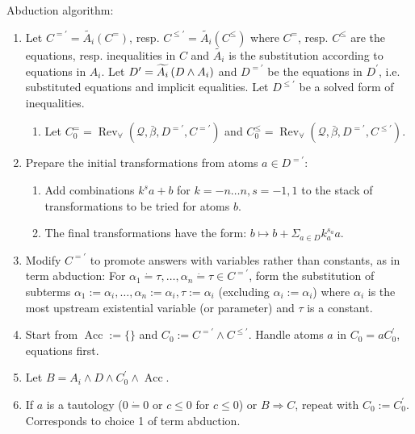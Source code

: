 \documentclass{article}
\newcommand{\assign}{:=}
\newcommand{\tmop}[1]{\ensuremath{\operatorname{#1}}}
\begin{document}
Abduction algorithm:
\begin{enumerate}
  \item Let $C^{=\prime} = \widetilde{A_i} (C^=)$, resp. $C^{\leqslant \prime}
  = \widetilde{A_i} (C^{\leqslant})$ where $C^=$, resp. $C^{\leqslant}$ are
  the equations, resp. inequalities in $C$ and $\widetilde{A_i}$ is the
  substitution according to equations in $A_i$. Let $D^{\prime} =
  \widetilde{A_i} \left( D \wedge {\nobreak} A_i \right)$ and $D^{=\prime}$ be
  the equations in $D^{\prime}$, i.e. substituted equations and implicit
  equalities. Let $D^{\leqslant \prime}$ be a solved form of inequalities.
  \begin{enumerate}
    \item Let $C^=_0 = \tmop{Rev}_{\forall} (\mathcal{Q}, \bar{\beta},
    D^{=\prime}, C^{=\prime})$ and $C^{\leqslant}_0 = \tmop{Rev}_{\forall}
    (\mathcal{Q}, \bar{\beta}, D^{=\prime}, C^{\leqslant \prime})$.
  \end{enumerate}
  \item Prepare the initial transformations from atoms $a \in D^{=\prime}$:
  \begin{enumerate}
    \item Add combinations $k^s a + b$ for $k = - n \ldots n, s = - 1, 1$ to
    the stack of transformations to be tried for atoms $b$.
    
    \item The final transformations have the form: $b \mapsto b + \Sigma_{a
    \in D} k_a^{s_a} a$.
  \end{enumerate}
  \item Modify $C^{=\prime}$ to promote answers with variables rather than
  constants, as in term abduction: For $\alpha_1 \dot{=} \tau, \ldots,
  \alpha_n \dot{=} \tau \in C^{=\prime}$, form the substitution of subterms
  $\alpha_1 \assign \alpha_i, \ldots, \alpha_n \assign \alpha_i, \tau \assign
  \alpha_i$ (excluding $\alpha_i \assign \alpha_i$) where $\alpha_i$ is the
  most upstream existential variable (or parameter) and $\tau$ is a constant.
  
  \item Start from $\tmop{Acc} \assign \{ \}$ and $C_0 \assign C^{=\prime}
  \wedge C^{\leqslant \prime}$. Handle atoms $a$ in $C_0 = a C_0^{\prime}$,
  equations first.
  
  \item Let $B = A_i \wedge D \wedge C_0^{\prime} \wedge \tmop{Acc}$.
  
  \item If $a$ is a tautology ($0 \dot{=} 0$ or $c \leq 0$ for $c \leqslant
  0$) or $B \Rightarrow C$, repeat with $C_0 \assign C_0^{\prime}$.
  Corresponds to choice 1 of term abduction.
  

\end{enumerate}
\end{document}
